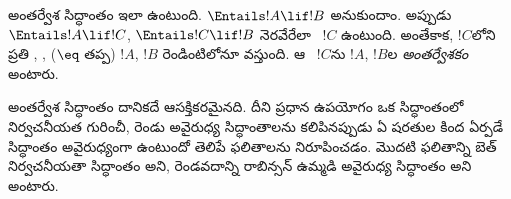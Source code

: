 \documentclass[../../../include/open-logic-section]{subfiles}
\begin{document}


అంతర్వేశ సిద్ధాంతం ఇలా ఉంటుంది. $\Entails !A \lif !B$ అనుకుందాం.
అప్పుడు $\Entails !A \lif !C$, $\Entails !C \lif !B$ నెరవేరేలా
~$!C$ ఉంటుంది. అంతేకాక, $!C$లోని
ప్రతి ,
,
 ($\eq$ తప్ప) $!A$, $!B$
రెండింటిలోనూ వస్తుంది. ఆ ~$!C$ను
$!A$, $!B$ల \emph{అంతర్వేశకం} అంటారు.

అంతర్వేశ సిద్ధాంతం దానికదే ఆసక్తికరమైనది. దీని ప్రధాన ఉపయోగం
ఒక సిద్ధాంతంలో నిర్వచనీయత గురించీ, రెండు అవైరుధ్య
సిద్ధాంతాలను కలిపినప్పుడు ఏ షరతుల కింద ఏర్పడే సిద్ధాంతం అవైరుధ్యంగా ఉంటుందో
తెలిపే ఫలితాలను నిరూపించడం. మొదటి ఫలితాన్ని బెత్
నిర్వచనీయతా సిద్ధాంతం అని, రెండవదాన్ని రాబిన్సన్ ఉమ్మడి అవైరుధ్య
సిద్ధాంతం అని అంటారు.
\end{document}

